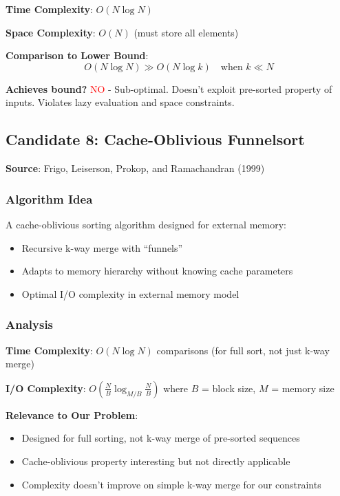 \documentclass[11pt]{article}
\begin{document}
\textbf{Time Complexity}: $O(N \log N)$

\textbf{Space Complexity}: $O(N)$ (must store all elements)

\textbf{Comparison to Lower Bound}:
\[
O(N \log N) \gg O(N \log k) \quad \text{when } k \ll N
\]

\textbf{Achieves bound?} \textcolor{red}{NO} - Sub-optimal. Doesn't exploit pre-sorted property of inputs. Violates lazy evaluation and space constraints.

\subsection{Candidate 8: Cache-Oblivious Funnelsort}

\textbf{Source}: Frigo, Leiserson, Prokop, and Ramachandran (1999)

\subsubsection{Algorithm Idea}

A cache-oblivious sorting algorithm designed for external memory:
\begin{itemize}
    \item Recursive k-way merge with ``funnels''
    \item Adapts to memory hierarchy without knowing cache parameters
    \item Optimal I/O complexity in external memory model
\end{itemize}

\subsubsection{Analysis}

\textbf{Time Complexity}: $O(N \log N)$ comparisons (for full sort, not just k-way merge)

\textbf{I/O Complexity}: $O(\frac{N}{B} \log_{M/B} \frac{N}{B})$ where $B$ = block size, $M$ = memory size

\textbf{Relevance to Our Problem}:
\begin{itemize}
    \item Designed for full sorting, not k-way merge of pre-sorted sequences
    \item Cache-oblivious property interesting but not directly applicable
    \item Complexity doesn't improve on simple k-way merge for our constraints
\end{itemize}
\end{document}

